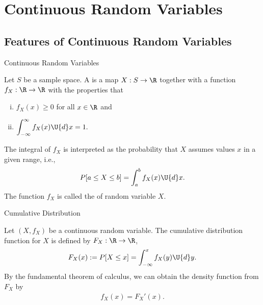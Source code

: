 \section{Continuous Random Variables}

\subsection{Features of Continuous Random Variables}

\begin{frame}{Continuous Random Variables}

\justifying
{} Let $S$ be a sample space. A  is a map $X: S\rightarrow \R$ together with a function $f_X: \R\rightarrow \R$ with the properties that
\begin{enumerate}[(i).]
	\item $f_X(x) \geq 0$ for all $x\in \R$ and
	\item $\displaystyle \int_{-\infty}^{\infty} f_X(x) \U{d}x = 1.$
\end{enumerate}
The integral of $f_X$ is interpreted as the probability that $X$ assumes values $x$ in a given range, i.e.,
\begin{align*}
P[a\leq X \leq b] = \int_a^b f_X(x)\U{d}x.
\end{align*}
The function $f_X$ is called the  of random variable $X$.

\end{frame}

\begin{frame}{Cumulative Distribution}

\justifying
{} Let $(X, f_X)$ be a continuous random variable. The cumulative distribution function for $X$ is defined by $F_X: \R\rightarrow \R$,
\begin{align*}
F_X(x) := P[X\leq x] = \int_{-\infty}^{x} f_X(y)\U{d}y.
\end{align*}
By the fundamental theorem of calculus, we can obtain the density function from $F_X$ by
\begin{align*}
f_X(x) = F_X'(x).
\end{align*}

\end{frame}


